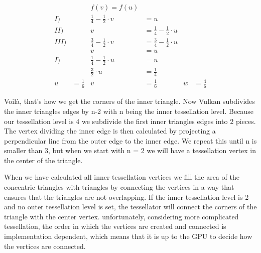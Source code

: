 \documentclass[12pt]{report} \usepackage{preamble}
\begin{document}
\[
	\begin{aligned}
		     &               & f(v)= f(u)                                                                                \\
		I)   &               & \frac{1}{4} - \frac{1}{2}\cdot v & = u                                                    \\
		II)  &               & v                                & = \frac{1}{4} - \frac{1}{2}\cdot u                     \\
		III) &               & \frac{3}{4} -\frac{1}{2}\cdot v  & = \frac{3}{4} -\frac{1}{2}\cdot u                      \\
		     &               & v                                & = u                                                    \\
		I)   &               & \frac{1}{4} - \frac{1}{2}\cdot u & = u                                                    \\
		     &               & \frac{3}{2}\cdot u               & = \frac{1}{4}                                          \\
		u    & = \frac{1}{6} & v                                & = \frac{1}{6}                      & w & = \frac{4}{6}
	\end{aligned}
\]

Voil\`a, that's how we get the corners of the inner triangle.
Now Vulkan subdivides the inner triangles edges by n-2 with n being the
inner tessellation level. Because our tessellation level is 4
we subdivide the first inner triangles edges into 2 pieces.
The vertex dividing the inner edge is then calculated by projecting a
perpendicular line from the outer edge to the inner edge.
We repeat this until n is smaller than 3, but when we start with n = 2
we will have a tessellation vertex in the center of the triangle. \cite{tessellation}

When we have calculated all inner tessellation vertices we fill the area of the
concentric triangles with triangles by connecting the vertices in a way that
ensures that the triangles are not overlapping. If the inner tessellation level is 2 and
no outer tessellation level is set, the tessellator will connect the corners
of the triangle with the center vertex. \cite{tessellation}
unfortunately, considering more complicated tessellation, the order in which the vertices
are created and connected is implementation dependent,
which means that it is up to the \ac{GPU} to decide how the vertices are connected. \cite{tessellation}
\end{document}
